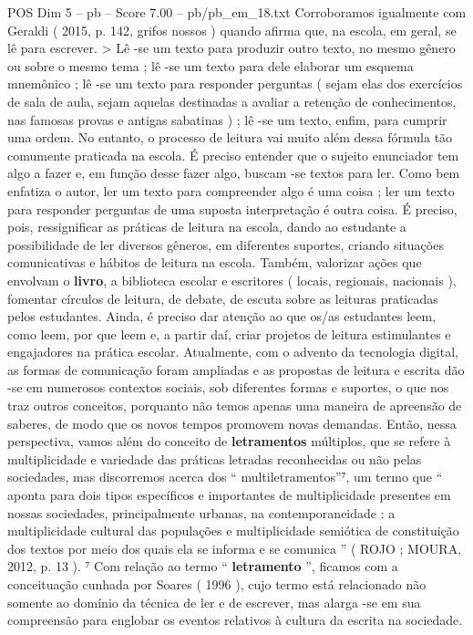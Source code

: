 \begin{textsample}{POS Dim 5 – pb – Score 7.00 – pb/pb\_em\_18.txt}
Corroboramos igualmente com Geraldi ( 2015, p. 142, grifos nossos ) quando afirma que, na escola, em geral, se lê para escrever. > Lê -se um texto para produzir outro texto, no mesmo gênero ou sobre o mesmo tema ; lê -se um texto para dele elaborar um esquema mnemônico ; lê -se um texto para responder perguntas ( sejam elas dos exercícios de sala de aula, sejam aquelas destinadas a avaliar a retenção de conhecimentos, nas famosas provas e antigas sabatinas ) ; lê -se um texto, enfim, para cumprir uma ordem.
No entanto, o processo de leitura vai muito além dessa fórmula tão comumente praticada na escola.
É preciso entender que o sujeito enunciador tem algo a fazer e, em função desse fazer algo, buscam -se textos para ler.
Como bem enfatiza o autor, ler um texto para compreender algo é uma coisa ; ler um texto para responder perguntas de uma suposta interpretação é outra coisa.
É preciso, pois, ressignificar as práticas de leitura na escola, dando ao estudante a possibilidade de ler diversos gêneros, em diferentes suportes, criando situações comunicativas e hábitos de leitura na escola.
Também, valorizar ações que envolvam o \textbf{livro}, a biblioteca escolar e escritores ( locais, regionais, nacionais ), fomentar círculos de leitura, de debate, de escuta sobre as leituras praticadas pelos estudantes.
Ainda, é preciso dar atenção ao que os/as estudantes leem, como leem, por que leem e, a partir daí, criar projetos de leitura estimulantes e engajadores na prática escolar.
Atualmente, com o advento da tecnologia digital, as formas de comunicação foram ampliadas e as propostas de leitura e escrita dão -se em numerosos contextos sociais, sob diferentes formas e suportes, o que nos traz outros conceitos, porquanto não temos apenas uma maneira de apreensão de saberes, de modo que os novos tempos promovem novas demandas.
Então, nessa perspectiva, vamos além do conceito de \textbf{letramentos} múltiplos, que se refere à multiplicidade e variedade das práticas letradas reconhecidas ou não pelas sociedades, mas discorremos acerca dos “ multiletramentos”⁷, um termo que “ aponta para dois tipos específicos e importantes de multiplicidade presentes em nossas sociedades, principalmente urbanas, na contemporaneidade : a multiplicidade cultural das populações e multiplicidade semiótica de constituição dos textos por meio dos quais ela se informa e se comunica ” ( ROJO ; MOURA, 2012, p. 13 ). ⁷ Com relação ao termo “ \textbf{letramento} ”, ficamos com a conceituação cunhada por Soares ( 1996 ), cujo termo está relacionado não somente ao domínio da técnica de ler e de escrever, mas alarga -se em sua compreensão para englobar os eventos relativos à cultura da escrita na sociedade.

\end{textsample}
